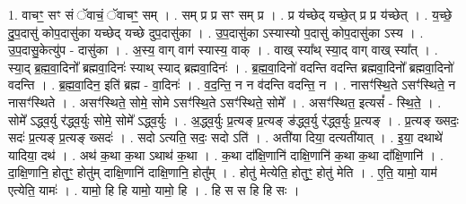 \documentclass[17pt]{extarticle}
\begin{document}
1. वाचꣳ॒॒ सꣳ सं ॅवाचं॒ ॅवाचꣳ॒॒ सम् । . सम् प्र प्र सꣳ सम् प्र । . प्र य॑च्छेद् यच्छे॒त् प्र प्र य॑च्छेत् । . य॒च्छे॒ दु॒प॒दासु॑ कोप॒दासु॑का यच्छेद् यच्छे दुप॒दासु॑का । . उ॒प॒दासु॑का ऽस्यास्यो प॒दासु॑ कोप॒दासु॑का ऽस्य । . उ॒प॒दासु॒केत्यु॑प - दासु॑का । . अ॒स्य॒ वाग् वाग॑ स्यास्य॒ वाक् । . वाख् स्या᳚थ् स्या॒द् वाग् वाख् स्या᳚त् । . स्या॒द् ब्र॒ह्म॒वा॒दिनो᳚ ब्रह्मवा॒दिनः॑ स्याथ् स्याद् ब्रह्मवा॒दिनः॑ । . ब्र॒ह्म॒वा॒दिनो॑ वदन्ति वदन्ति ब्रह्मवा॒दिनो᳚ ब्रह्मवा॒दिनो॑ वदन्ति । . ब्र॒ह्म॒वा॒दिन॒ इति॑ ब्रह्म - वा॒दिनः॑ । . व॒द॒न्ति॒ न न व॑दन्ति वदन्ति॒ न । . नासꣳ॑स्थि॒ते ऽसꣳ॑स्थिते॒ न नासꣳ॑स्थिते । . असꣳ॑स्थिते॒ सोमे॒ सोमे ऽसꣳ॑स्थि॒ते ऽसꣳ॑स्थिते॒ सोमे᳚ । . असꣳ॑स्थित॒ इत्यसं᳚ - स्थि॒ते॒ । . सोमे᳚ ऽद्ध्व॒र्यु र॑द्ध्व॒र्युः सोमे॒ सोमे᳚ ऽद्ध्व॒र्युः । . अ॒द्ध्व॒र्युः प्र॒त्यङ् प्र॒त्यङ् ङ॑द्ध्व॒र्यु र॑द्ध्व॒र्युः प्र॒त्यङ् । . प्र॒त्यङ् ख्सदः॒ सदः॑ प्र॒त्यङ् प्र॒त्यङ् ख्सदः॑ । . सदो ऽत्यति॒ सदः॒ सदो ऽति॑ । . अती॑या दिया॒ दत्यती॑यात् । . इ॒या॒ दथाथे॑ यादिया॒ दथ॑ । . अथ॑ क॒था क॒था ऽथाथ॑ क॒था । . क॒था दा᳚क्षि॒णानि॑ दाक्षि॒णानि॑ क॒था क॒था दा᳚क्षि॒णानि॑ । . दा॒क्षि॒णानि॒ होतुꣳ॒॒ होतु॑म् दाक्षि॒णानि॑ दाक्षि॒णानि॒ होतु᳚म् । . होतु॑ मेत्येति॒ होतुꣳ॒॒ होतु॑ मेति । . ए॒ति॒ यामो॒ याम॑ एत्येति॒ यामः॑ । . यामो॒ हि हि यामो॒ यामो॒ हि । . हि स स हि हि सः । \newline
\end{document}
